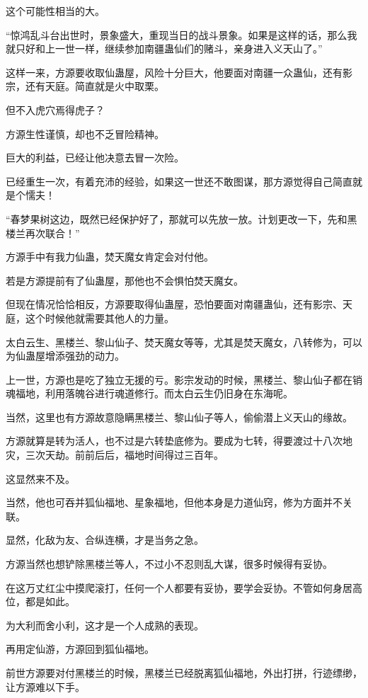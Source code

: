 \begin{this_body}
这个可能性相当的大。

“惊鸿乱斗台出世时，景象盛大，重现当日的战斗景象。如果是这样的话，那么我就只好和上一世一样，继续参加南疆蛊仙们的赌斗，亲身进入义天山了。”

这样一来，方源要收取仙蛊屋，风险十分巨大，他要面对南疆一众蛊仙，还有影宗，还有天庭。简直就是火中取栗。

但不入虎穴焉得虎子？

方源生性谨慎，却也不乏冒险精神。

巨大的利益，已经让他决意去冒一次险。

已经重生一次，有着充沛的经验，如果这一世还不敢图谋，那方源觉得自己简直就是个懦夫！

“春梦果树这边，既然已经保护好了，那就可以先放一放。计划更改一下，先和黑楼兰再次联合！”

方源手中有我力仙蛊，焚天魔女肯定会对付他。

若是方源提前有了仙蛊屋，那他也不会惧怕焚天魔女。

但现在情况恰恰相反，方源要取得仙蛊屋，恐怕要面对南疆蛊仙，还有影宗、天庭，这个时候他就需要其他人的力量。

太白云生、黑楼兰、黎山仙子、焚天魔女等等，尤其是焚天魔女，八转修为，可以为仙蛊屋增添强劲的动力。

上一世，方源也是吃了独立无援的亏。影宗发动的时候，黑楼兰、黎山仙子都在销魂福地，利用落魄谷进行魂道修行。而太白云生仍旧身在东海呢。

当然，这里也有方源故意隐瞒黑楼兰、黎山仙子等人，偷偷潜上义天山的缘故。

方源就算是转为活人，也不过是六转垫底修为。要成为七转，得要渡过十八次地灾，三次天劫。前前后后，福地时间得过三百年。

这显然来不及。

当然，他也可吞并狐仙福地、星象福地，但他本身是力道仙窍，修为方面并不关联。

显然，化敌为友、合纵连横，才是当务之急。

方源当然也想铲除黑楼兰等人，不过小不忍则乱大谋，很多时候得有妥协。

在这万丈红尘中摸爬滚打，任何一个人都要有妥协，要学会妥协。不管如何身居高位，都是如此。

为大利而舍小利，这才是一个人成熟的表现。

再用定仙游，方源回到狐仙福地。

前世方源要对付黑楼兰的时候，黑楼兰已经脱离狐仙福地，外出打拼，行迹缥缈，让方源难以下手。


\end{this_body}
